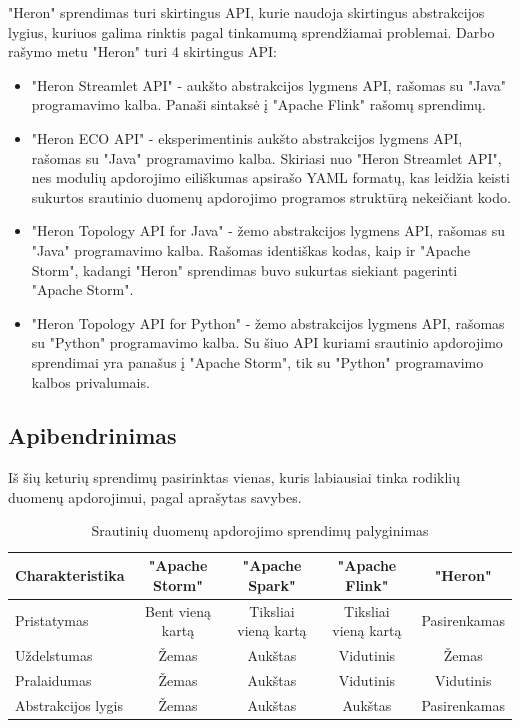 \documentclass{VUMIFPSbakalaurinis}
\begin{document}
"Heron" sprendimas turi skirtingus API, kurie naudoja skirtingus abstrakcijos lygius, kuriuos galima rinktis pagal tinkamumą sprendžiamai problemai. Darbo rašymo metu "Heron" turi 4 skirtingus API:
\begin{itemize}
    \item "Heron Streamlet API" - aukšto abstrakcijos lygmens API, rašomas su "Java" programavimo kalba. Panaši sintaksė į "Apache Flink" rašomų sprendimų.
    \item "Heron ECO API" - eksperimentinis aukšto abstrakcijos lygmens API, rašomas su "Java" programavimo kalba. Skiriasi nuo "Heron Streamlet API", nes modulių apdorojimo eiliškumas apsirašo YAML formatų, kas leidžia keisti sukurtos srautinio duomenų apdorojimo programos struktūrą nekeičiant kodo.
    \item "Heron Topology API for Java" - žemo abstrakcijos lygmens API, rašomas su "Java" programavimo kalba. Rašomas identiškas kodas, kaip ir "Apache Storm", kadangi "Heron" sprendimas buvo sukurtas siekiant pagerinti "Apache Storm".
    \item "Heron Topology API for Python" - žemo abstrakcijos lygmens API, rašomas su "Python" programavimo kalba. Su šiuo API kuriami srautinio apdorojimo sprendimai yra panašus į "Apache Storm", tik su "Python" programavimo kalbos privalumais.
\end{itemize}  


\subsection{Apibendrinimas}
Iš šių keturių sprendimų pasirinktas vienas, kuris labiausiai tinka rodiklių duomenų apdorojimui, pagal aprašytas savybes.\par

\begin{table}[!htbp]
    \begin{center}
        \caption{Srautinių duomenų apdorojimo sprendimų palyginimas}
        \label{table:comparer}
        \begin{tabular}{ | l | c | c | c | c | }
            \hline
            \cellcolor[gray]{0.8} Charakteristika & \cellcolor[gray]{0.9} "Apache Storm" & \cellcolor[gray]{0.9} "Apache Spark" & \cellcolor[gray]{0.9} "Apache Flink" & \cellcolor[gray]{0.9} "Heron" \\* \hline
            \cellcolor[gray]{0.9} Pristatymas & Bent vieną kartą & Tiksliai vieną kartą & Tiksliai vieną kartą & Pasirenkamas \\* \hline
            \cellcolor[gray]{0.9} Uždelstumas & Žemas & Aukštas & Vidutinis & Žemas \\* \hline
            \cellcolor[gray]{0.9} Pralaidumas & Žemas & Aukštas & Vidutinis & Vidutinis \\* \hline
            \cellcolor[gray]{0.9} Abstrakcijos lygis & Žemas & Aukštas & Aukštas & Pasirenkamas \\* \hline
        \end{tabular}
    \end{center}
\end{table}\par
\end{document}
